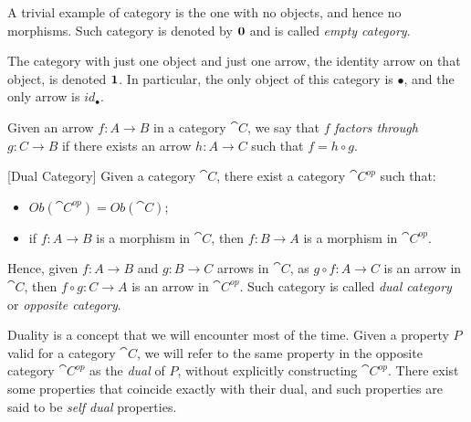 \begin{example}\label{ex:0_cat}
    A trivial example of category is the one with no objects, and hence no morphisms. Such category is denoted by $\textbf 0$ and is called \emph{empty category}.
\end{example}

\begin{example}\label{ex:1_cat}
    The category with just one object and just one arrow, the identity arrow on that object, is denoted $\textbf 1$. In particular, the only object of this category is $\bullet$, and the only arrow is $id_{\bullet}$.
\end{example}

Given an arrow $f: A \rightarrow B$ in a category $\cat C$, we say that $f$ \emph{factors through} $g: C \rightarrow B$ if there exists an arrow $h: A \rightarrow C$ such that $f = h \circ g$.

\begin{definition}\label{def:dual_cat}[Dual Category]
    Given a category $\cat C$, there exist a category $\cat C^{op}$ such that:
    \begin{itemize}
        \item $Ob(\cat C^{op}) = Ob(\cat C)$;
        \item if $f: A \rightarrow B$ is a morphism in $\cat C$, then $f: B\rightarrow A$ is a morphism in $\cat C ^ {op}$.
    \end{itemize}
    Hence, given $f : A \rightarrow B$ and $g: B \rightarrow C$ arrows in $\cat C$, as $g \circ f: A \rightarrow C$ is an arrow in $\cat C$, then $f \circ g: C \rightarrow A$ is an arrow in $\cat C ^{op}$.
    Such category is called \emph{dual category} or \emph{opposite category}.
\end{definition}

Duality is a concept that we will encounter most of the time. Given a property $P$ valid for a category $\cat C$, we will refer to the same property in the opposite category $\cat C^{op}$ as the \emph{dual} of $P$, without explicitly constructing $\cat C^{op}$. There exist some properties that coincide exactly with their dual, and such properties are said to be \emph{self dual} properties.


